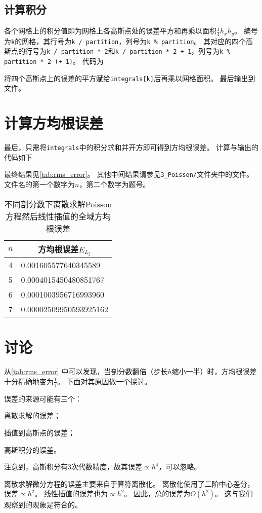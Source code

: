 \subsection{计算积分}
各个网格上的积分值即为网格上各高斯点处的误差平方和再乘以面积$\frac{1}{4}h_xh_y$。
编号为\texttt{k}的网格，其行号为\texttt{k / partition}，列号为\texttt{k \% partition}。
其对应的四个高斯点的行号为\texttt{k / partition * 2}和\texttt{k / partition * 2 + 1}，列号为\texttt{k \% partition * 2 (+ 1)}。
代码为
{
    \linespread{1.0}
    
}
将四个高斯点上的误差的平方赋给\texttt{integrals[k]}后再乘以网格面积。
最后输出到文件。

\section{计算方均根误差}
最后，只需将\texttt{integrals}中的积分求和并开方即可得到方均根误差。
计算与输出的代码如下
{
    \linespread{1.0}
    
}
最终结果见\autoref{tab:rms_error}。
其他中间结果请参见\texttt{3\_Poisson/}文件夹中的文件。
文件名的第一个数字为$n$，第二个数字为题号。

\begin{table}
\centering
\caption{不同剖分数下离散求解Poisson方程然后线性插值的全域方均根误差}
\label{tab:rms_error}
\begin{tabular}{cl}
\toprule
$n$ & \multicolumn{1}{c}{方均根误差$E_{L_2}$} \\ \midrule
4 & 0.001605577640345589 \\
5 & 0.0004015450480851767 \\
6 & 0.0001003956716993960 \\
7 & 0.00002509950593925162 \\ \bottomrule
\end{tabular}
\end{table}

\section{讨论}
从\autoref{tab:rms_error} 中可以发现，当剖分数翻倍（步长$h$缩小一半）时，方均根误差十分精确地变为$\frac{1}{4}$。
下面对其原因做一个探讨。

误差的来源可能有三个：
\begin{inparaenum}
    \item 离散求解的误差；
    \item 插值到高斯点的误差；
    \item 高斯积分的误差。
\end{inparaenum}
注意到，高斯积分有3次代数精度，故其误差$\propto h^4$，可以忽略。

离散求解微分方程的误差主要来自于算符离散化。
离散化使用了二阶中心差分，误差$\propto h^2$。
线性插值的误差也为$\propto h^2$。
因此，总的误差为$O(h^2)$。
这与我们观察到的现象是符合的。

